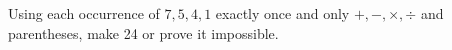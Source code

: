 Using each occurrence of $7,5,4,1$ exactly once and only $+,-,\times,\div$ and parentheses, make 24 or prove it impossible.

